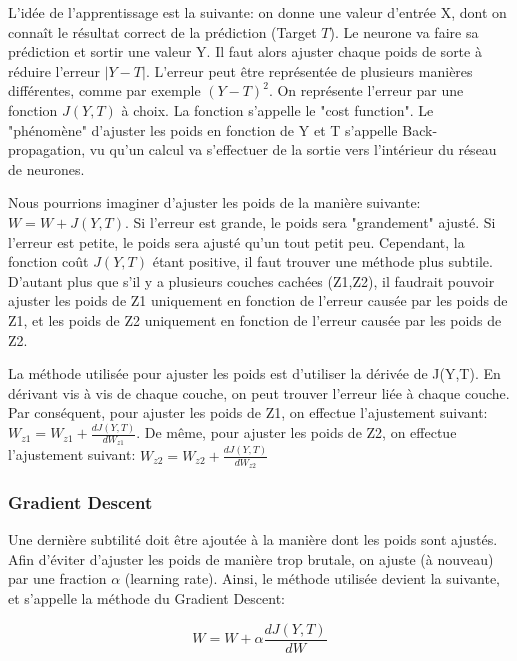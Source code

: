 \documentclass[11pt,a4paper]{report}
\begin{document}
    \par L'idée de l'apprentissage est la suivante: on donne une valeur d'entrée X, dont on connaît le résultat correct de la prédiction (Target $T$). Le neurone va faire sa prédiction et sortir une valeur Y. Il faut alors ajuster chaque poids de sorte à réduire l'erreur $|Y-T|$. L'erreur peut être représentée de plusieurs manières différentes, comme par exemple $(Y - T)^2$. On représente l'erreur par une fonction $J(Y, T)$ à choix. La fonction s'appelle le "cost function". Le "phénomène" d'ajuster les poids en fonction de Y et T s'appelle Back-propagation, vu qu'un calcul va s'effectuer de la sortie vers l'intérieur du réseau de neurones. 

    \par Nous pourrions imaginer d'ajuster les poids de la manière suivante: $W = W + J(Y,T)$. Si l'erreur est grande, le poids sera "grandement" ajusté. Si l'erreur est petite, le poids sera ajusté qu'un tout petit peu. Cependant, la fonction coût $J(Y,T)$ étant positive, il faut trouver une méthode plus subtile. D'autant plus que s'il y a plusieurs couches cachées (Z1,Z2), il faudrait pouvoir ajuster les poids de Z1 uniquement en fonction de l'erreur causée par les poids de Z1, et les poids de Z2 uniquement en fonction de l'erreur causée par les poids de Z2. 

    \par La méthode utilisée pour ajuster les poids est d'utiliser la dérivée de J(Y,T). En dérivant vis à vis de chaque couche, on peut trouver l'erreur liée à chaque couche. Par conséquent, pour ajuster les poids de Z1, on effectue l'ajustement suivant: $W_{z1} = W_{z1} + \frac{dJ(Y,T)}{dW_{z1}}$. De même, pour ajuster les poids de Z2, on effectue l'ajustement suivant: $W_{z2} = W_{z2} + \frac{dJ(Y,T)}{dW_{z2}}$
  
  \subsubsection{Gradient Descent}
  
    \par Une dernière subtilité doit être ajoutée à la manière dont les poids sont ajustés. Afin d'éviter d'ajuster les poids de manière trop brutale, on ajuste (à nouveau) par une fraction $\alpha$ (learning rate). Ainsi, le méthode utilisée devient la suivante, et s'appelle la méthode du Gradient Descent: 
    
    $$W = W + \alpha \frac{dJ(Y,T)}{dW}$$
    
\end{document}
